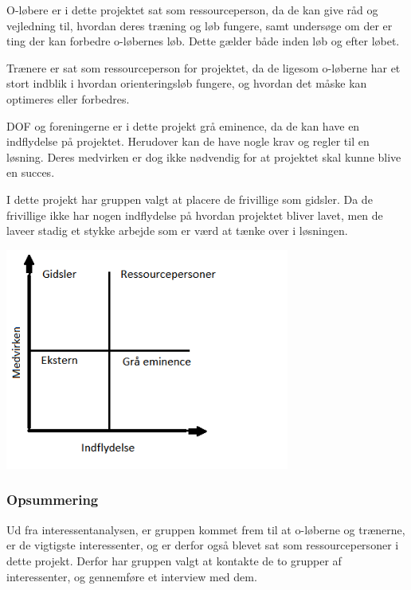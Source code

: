 O-løbere er i dette projektet sat som ressourceperson, da de kan give råd og vejledning til, hvordan deres træning og løb fungere, samt undersøge om der er ting der kan forbedre o-løbernes løb. Dette gælder både inden løb og efter løbet.

Trænere er sat som ressourceperson for projektet, da de ligesom o-løberne har et stort indblik i hvordan orienteringsløb fungere, og hvordan det måske kan optimeres eller forbedres. 

DOF og foreningerne er i dette projekt grå eminence, da de kan have en indflydelse på projektet. Herudover kan de have nogle krav og regler til en løsning. Deres medvirken er dog ikke nødvendig for at projektet skal kunne blive en succes.

I dette projekt har gruppen valgt at placere de frivillige som gidsler. Da de frivillige ikke har nogen indflydelse på hvordan projektet bliver lavet, men de laveer stadig et stykke arbejde som er værd at tænke over i løsningen.    

\includegraphics[width=0.70\textwidth]{billeder/matrix}
\vspace{0.20cm}

\subsubsection{Opsummering}
Ud fra interessentanalysen, er gruppen kommet frem til at o-løberne og trænerne, er de vigtigste interessenter, og er derfor også blevet sat som ressourcepersoner i dette projekt. Derfor har gruppen valgt at kontakte de to grupper af interessenter, og gennemføre et interview med dem. 
